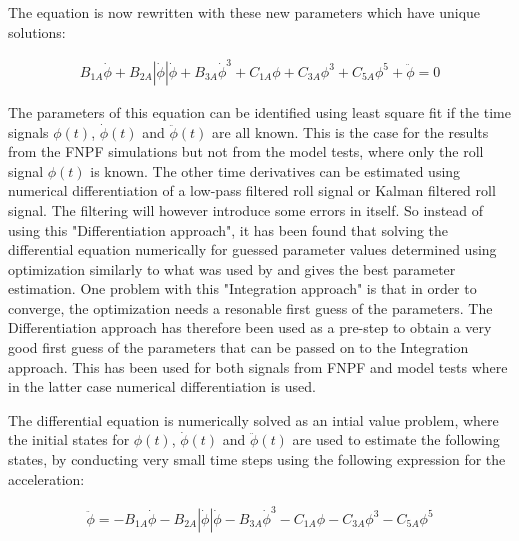     

    The equation is now rewritten with these new parameters which have
unique solutions:
 
            
    
    \begin{equation}
\begin{aligned}
B_{1A} \dot{\phi} + B_{2A} \left|{\dot{\phi}}\right| \dot{\phi} + B_{3A} \dot{\phi}^{3} + C_{1A} \phi + C_{3A} \phi^{3} + C_{5A} \phi^{5} + \ddot{\phi} = 0
\end{aligned}
\label{eq:equation}
\end{equation}

    

    The parameters of this equation can be identified using least square fit
if the time signals $\phi(t)$, $\dot{\phi}(t)$ and
$\ddot{\phi}(t)$ are all known. This is the case for the results from
the FNPF simulations but not from the model tests, where only the roll
signal $\phi(t)$ is known. The other time derivatives can be estimated
using numerical differentiation of a low-pass filtered roll signal or
Kalman filtered roll signal. The filtering will however introduce some
errors in itself. So instead of using this "Differentiation approach",
it has been found that solving the differential equation numerically for
guessed parameter values determined using optimization similarly to what
was used by \cite{7505983/FJHQJJUH} and \cite{7505983/9B7QMVJJ} gives
the best parameter estimation. One problem with this "Integration
approach" is that in order to converge, the optimization needs a
resonable first guess of the parameters. The Differentiation approach
has therefore been used as a pre-step to obtain a very good first guess
of the parameters that can be passed on to the Integration approach.
This has been used for both signals from FNPF and model tests where in
the latter case numerical differentiation is used.

The differential equation is numerically solved as an intial value
problem, where the initial states for $\phi(t)$, $\dot{\phi}(t)$ and
$\ddot{\phi}(t)$ are used to estimate the following states, by
conducting very small time steps using the following expression for the
acceleration:
 
            
    
    \begin{equation}
\begin{aligned}
\ddot{\phi} = - B_{1A} \dot{\phi} - B_{2A} \left|{\dot{\phi}}\right| \dot{\phi} - B_{3A} \dot{\phi}^{3} - C_{1A} \phi - C_{3A} \phi^{3} - C_{5A} \phi^{5}
\end{aligned}
\label{eq:equation}
\end{equation}

